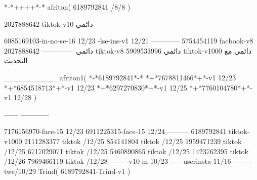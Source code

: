 *-*++++*-*
afriton(
6189792841 /8/8
)

2027888642 tiktok-v10
دائمي

6085169103-in-no-se-16 12/23
-lse-ins-v1 12/21
------------
5754454119 facbook-v8
دائمي
--------------
2027888642 tiktok-v8
دائمي
5909533996 tiktok-v1000
دائمي مع التحديث

__________
afriton1(
*-*6189792841*-*
*+*7678811466*+*-v1 12/23
*+*6854518713*+*-v1 12/23
*+*6297270830*+*-v1 12/25
*+*7760104780*+*-v1 12/28
)

------
------------

7176156970-face-15 12/23
6911225315-face-15 12/24
---------
6189792841 tiktok-v1000
2111283377 tiktok /12/25
854141804 tiktok /12/25
1959471239 tiktok /12/25
6717029071 tiktok /12/25
5460890865 tiktok /12/25
1423762395 tiktok /12/26
7969466119 tiktok /12/28
------
-v10-m 10/23
-----
userinsta 11/16
------
-twe/10/29
Trind(
6189792841-Trind-v1 
)
